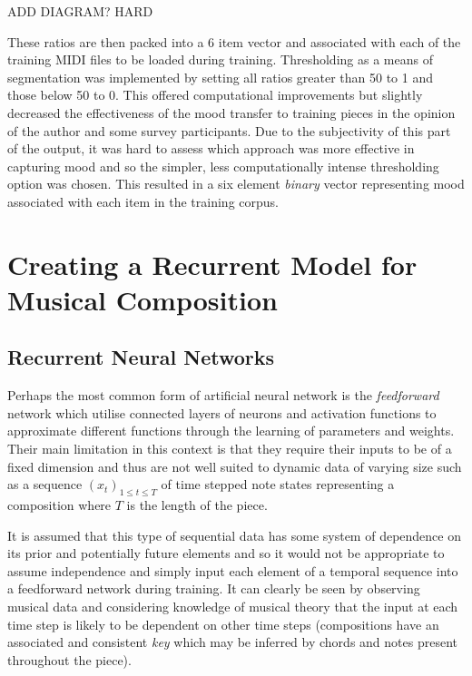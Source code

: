 \documentclass[12pt,]{article}
\begin{document}
ADD DIAGRAM? HARD

These ratios are then packed into a 6 item vector and associated with
each of the training MIDI files to be loaded during training.
Thresholding as a means of segmentation was implemented by setting all
ratios greater than 50 to 1 and those below 50 to 0. This offered
computational improvements but slightly decreased the effectiveness of
the mood transfer to training pieces in the opinion of the author and
some survey participants. Due to the subjectivity of this part of the
output, it was hard to assess which approach was more effective in
capturing mood and so the simpler, less computationally intense
thresholding option was chosen. This resulted in a six element
\emph{binary} vector representing mood associated with each item in the
training corpus.

\hypertarget{creating-a-recurrent-model-for-musical-composition}{%
\section{Creating a Recurrent Model for Musical
Composition}\label{creating-a-recurrent-model-for-musical-composition}}

\hypertarget{recurrent-neural-networks}{%
\subsection{Recurrent Neural Networks}\label{recurrent-neural-networks}}

Perhaps the most common form of artificial neural network is the
\emph{feedforward} network which utilise connected layers of neurons and
activation functions to approximate different functions through the
learning of parameters and weights. Their main limitation in this
context is that they require their inputs to be of a fixed dimension and
thus are not well suited to dynamic data of varying size such as a
sequence \((x_t)_{1\le t\le T}\) of time stepped note states
representing a composition where \(T\) is the length of the piece.

It is assumed that this type of sequential data has some system of
dependence on its prior and potentially future elements and so it would
not be appropriate to assume independence and simply input each element
of a temporal sequence into a feedforward network during training. It
can clearly be seen by observing musical data and considering knowledge
of musical theory that the input at each time step is likely to be
dependent on other time steps (compositions have an associated and
consistent \emph{key} which may be inferred by chords and notes present
throughout the piece).
\end{document}
